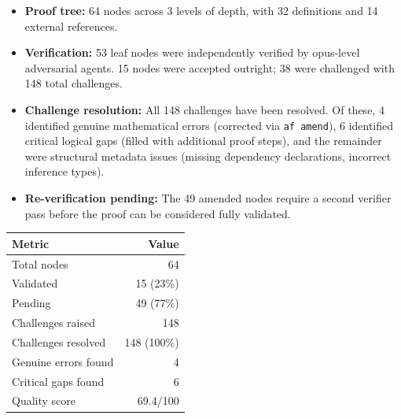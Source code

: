 \documentclass[11pt,a4paper]{article}
\theoremstyle{plain}
\theoremstyle{definition}
\theoremstyle{remark}
\begin{document}
\begin{itemize}
  \item \textbf{Proof tree:} 64 nodes across 3 levels of depth,
        with 32 definitions and 14 external references.
  \item \textbf{Verification:} 53 leaf nodes were independently
        verified by opus-level adversarial agents.
        15 nodes were accepted outright; 38 were challenged with
        148 total challenges.
  \item \textbf{Challenge resolution:} All 148 challenges have been
        resolved. Of these, 4 identified genuine mathematical errors
        (corrected via \texttt{af amend}), 6 identified critical
        logical gaps (filled with additional proof steps), and the
        remainder were structural metadata issues (missing dependency
        declarations, incorrect inference types).
  \item \textbf{Re-verification pending:} The 49 amended nodes
        require a second verifier pass before the proof can be
        considered fully validated.
\end{itemize}

\begin{center}
\begin{tabular}{lr}
\toprule
\textbf{Metric} & \textbf{Value} \\
\midrule
Total nodes & 64 \\
Validated & 15 (23\%) \\
Pending & 49 (77\%) \\
Challenges raised & 148 \\
Challenges resolved & 148 (100\%) \\
Genuine errors found & 4 \\
Critical gaps found & 6 \\
Quality score & 69.4/100 \\
\bottomrule
\end{tabular}
\end{center}
\end{document}
